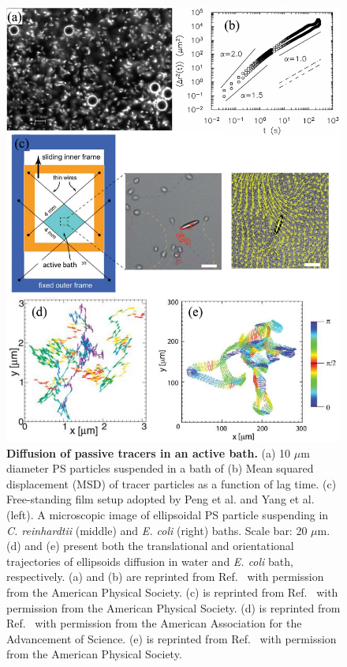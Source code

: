 \begin{figure}[!htbp]
	\begin{center}
	\includegraphics[height=5 in]{Figs/1-Intro/3.pdf}
	\end{center}
	\caption[Diffusion of Passive Tracers in an Active Bath]
	{
	\textbf{Diffusion of passive tracers in an active bath.}
	(a) 10 $\mu$m diameter PS particles suspended in a bath of 
	(b) Mean squared displacement (MSD) of tracer particles as a function of lag time.
	(c) Free-standing film setup adopted by Peng et al. and Yang et al. (left)\cite{Peng2016, Yang2016}. A microscopic image of ellipsoidal PS particle suspending in \textit{C. reinhardtii} (middle) and \textit{E. coli} (right) baths. Scale bar: 20 $\mu$m.
	(d) and (e) present both the translational and orientational trajectories of ellipsoids diffusion in water and \textit{E. coli} bath, respectively.
	(a) and (b) are reprinted from Ref.~\cite{Wu2000} with permission from the American Physical Society.
	(c) is reprinted from Ref.~\cite{Yang2016} with permission from the American Physical Society.
	(d) is reprinted from Ref.~\cite{Han2006} with permission from the American Association for the Advancement of Science.
	(e) is reprinted from Ref.~\cite{Peng2016} with permission from the American Physical Society.
	}
	\label{fig:diffusion-in-active-fluids}
\end{figure}


